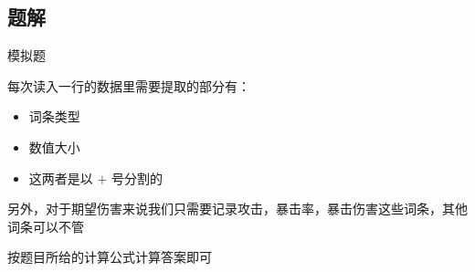 \subsection{题解}
\begin{frame}
模拟题

每次读入一行的数据里需要提取的部分有：

\begin{itemize}
    \item 词条类型
    \item 数值大小
    \item 这两者是以 $+$ 号分割的
\end{itemize}

另外，对于期望伤害来说我们只需要记录攻击，暴击率，暴击伤害这些词条，其他词条可以不管

按题目所给的计算公式计算答案即可
\end{frame}
